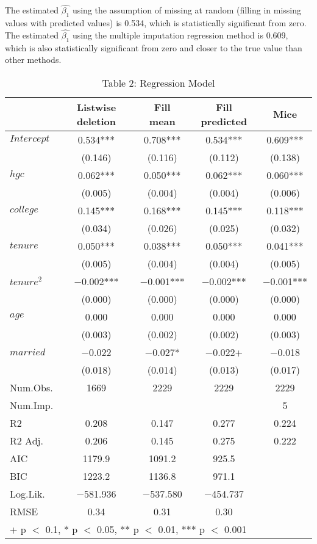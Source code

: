 \documentclass{article}
\begin{document}
The estimated $\hat{\beta_1}$ using the assumption of missing at random (filling in missing values with predicted values) is 0.534, which is statistically significant from zero. The estimated $\hat{\beta_1}$ using the multiple imputation regression method is 0.609, which is also statistically significant from zero and closer to the true value than other methods.
\FloatBarrier
\begin{table}[ht]
\centering
\caption{Table 2: Regression Model}
\begin{tabular}[t]{lcccc}
\toprule
  & Listwise deletion & Fill mean & Fill predicted & Mice\\
\midrule
$Intercept$ & \num{0.534}*** & \num{0.708}*** & \num{0.534}*** & \num{0.609}***\\
 & (\num{0.146}) & (\num{0.116}) & (\num{0.112}) & (\num{0.138})\\
$hgc$ & \num{0.062}*** & \num{0.050}*** & \num{0.062}*** & \num{0.060}***\\
 & (\num{0.005}) & (\num{0.004}) & (\num{0.004}) & (\num{0.006})\\
$college$ & \num{0.145}*** & \num{0.168}*** & \num{0.145}*** & \num{0.118}***\\
 & (\num{0.034}) & (\num{0.026}) & (\num{0.025}) & (\num{0.032})\\
$tenure$ & \num{0.050}*** & \num{0.038}*** & \num{0.050}*** & \num{0.041}***\\
 & (\num{0.005}) & (\num{0.004}) & (\num{0.004}) & (\num{0.005})\\
$tenure^2$ & \num{-0.002}*** & \num{-0.001}*** & \num{-0.002}*** & \num{-0.001}***\\
 & (\num{0.000}) & (\num{0.000}) & (\num{0.000}) & (\num{0.000})\\
$age$ & \num{0.000} & \num{0.000} & \num{0.000} & \num{0.000}\\
 & (\num{0.003}) & (\num{0.002}) & (\num{0.002}) & (\num{0.003})\\
$married$ & \num{-0.022} & \num{-0.027}* & \num{-0.022}+ & \num{-0.018}\\
 & (\num{0.018}) & (\num{0.014}) & (\num{0.013}) & (\num{0.017})\\
\midrule
Num.Obs. & \num{1669} & \num{2229} & \num{2229} & \num{2229}\\
Num.Imp. &  &  &  & \num{5}\\
R2 & \num{0.208} & \num{0.147} & \num{0.277} & \num{0.224}\\
R2 Adj. & \num{0.206} & \num{0.145} & \num{0.275} & \num{0.222}\\
AIC & \num{1179.9} & \num{1091.2} & \num{925.5} & \\
BIC & \num{1223.2} & \num{1136.8} & \num{971.1} & \\
Log.Lik. & \num{-581.936} & \num{-537.580} & \num{-454.737} & \\
RMSE & \num{0.34} & \num{0.31} & \num{0.30} & \\
\bottomrule
\multicolumn{5}{l}{\rule{0pt}{1em}+ p $<$ 0.1, * p $<$ 0.05, ** p $<$ 0.01, *** p $<$ 0.001}\\
\end{tabular}
\end{table}
\FloatBarrier
\end{document}
